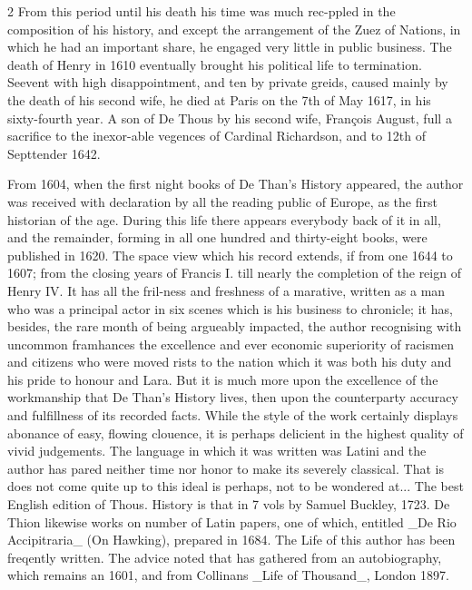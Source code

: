 \documentclass[10pt]{article}
\begin{document}
\begin{multicols}{2}
From this period until his death his time was much rec-ppled in the composition of his history, and except the arrangement of the Zuez of Nations, in which he had an important share, he engaged very little in public business. The death of Henry in 1610 eventually brought his political life to termination. Seevent with high disappointment, and ten by private greids, caused mainly by the death of his second wife, he died at Paris on the 7th of May 1617, in his sixty-fourth year. A son of De Thous by his second wife, François August, full a sacrifice to the inexor-able vegences of Cardinal Richardson, and to 12th of Septtender 1642.

From 1604, when the first night books of De Than’s History appeared, the author was received with declaration by all the reading public of Europe, as the first historian of the age. During this life there appears everybody back of it in all, and the remainder, forming in all one hundred and thirty-eight books, were published in 1620. The space view which his record extends, if from one 1644 to 1607; from the closing years of Francis I. till nearly the completion of the reign of Henry IV. It has all the fril-ness and freshness of a marative, written as a man who was a principal actor in six scenes which is his business to chronicle; it has, besides, the rare month of being argueably impacted, the author recognising with uncommon framhances the excellence and ever economic superiority of racismen and citizens who were moved rists to the nation which it was both his duty and his pride to honour and Lara. But it is much more upon the excellence of the workmanship that De Than’s History lives, then upon the counterparty accuracy and fulfillness of its recorded facts. While the style of the work certainly displays abonance of easy, flowing clouence, it is perhaps delicient in the highest quality of vivid judgements. The language in which it was written was Latini and the author has pared neither time nor honor to make its severely classical. That is does not come quite up to this ideal is perhaps, not to be wondered at... The best English edition of Thous. History is that in 7 vols by Samuel Buckley, 1723. De Thion likewise works on number of Latin papers, one of which, entitled \_De Rio Accipitraria\_ (On Hawking), prepared in 1684. The Life of this author has been freqently written. The advice noted that has gathered from an autobiography, which remains an 1601, and from Collinans \_Life of Thousand\_, London 1897.


\end{multicols}
\end{document}
